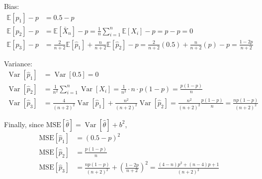 \documentclass[11pt]{report}
\DeclareMathOperator{\Var}{\text{Var}}
\newcommand{\E}{\mathbb{E}}
\begin{document}
\begin{enumerate}[1.]
\begin{enumerate}
                    \color{blue}
                    Bias:
                    \begin{align*}
                        \E[\hat p_1] - p & = \boxed{0.5 - p}                                                                                                                        \\
                        \E[\hat p_2] - p & = \E[\bar X_n] - p = \frac{1}{n} \sum_{i=1}^n \E[X_i] - p = p - p = \boxed{0}                                                            \\
                        \E[\hat p_3] - p & = \frac{2}{n+2} \E[\hat p_1] + \frac{n}{n+2} \E[\hat p_2] - p = \frac{2}{n+2} (0.5) + \frac{n}{n+2} (p) - p = \boxed{\frac{1 - 2p}{n+2}}
                    \end{align*}

                    Variance:
                    \begin{align*}
                        \Var[\hat p_1] & = \Var[0.5] = \boxed{0}                                                                                                                           \\
                        \Var[\hat p_2] & = \frac{1}{n^2} \sum_{i=1}^n \Var[X_i] = \frac{1}{n^2} \cdot n \cdot p(1-p) = \boxed{\frac{p(1-p)}{n}}                                            \\
                        \Var[\hat p_3] & = \frac{4}{(n+2)^2} \Var[\hat p_1] + \frac{n^2}{(n+2)^2} \Var[\hat p_2] =  \frac{n^2}{(n+2)^2} \frac{p(1-p)}{n} = \boxed{\frac{np(1-p)}{(n+2)^2}}
                    \end{align*}

                    Finally, since $\text{MSE}[\hat \theta] = \Var[\hat \theta] + b^2$,
                    \begin{align*}
                        \text{MSE}[\hat p_1] & = \boxed{(0.5 - p)^2}                                                                                  \\
                        \text{MSE}[\hat p_2] & = \boxed{\frac{p(1-p)}{n}}                                                                             \\
                        \text{MSE}[\hat p_3] & = \frac{np(1-p)}{(n+2)^2} + \left(\frac{1 - 2p}{n+2}\right)^2 = \frac{(4 - n)p^2 + (n-4)p +1}{(n+2)^2}
                    \end{align*}


                    \color{black}


\end{enumerate}
\end{enumerate}
\end{document}
